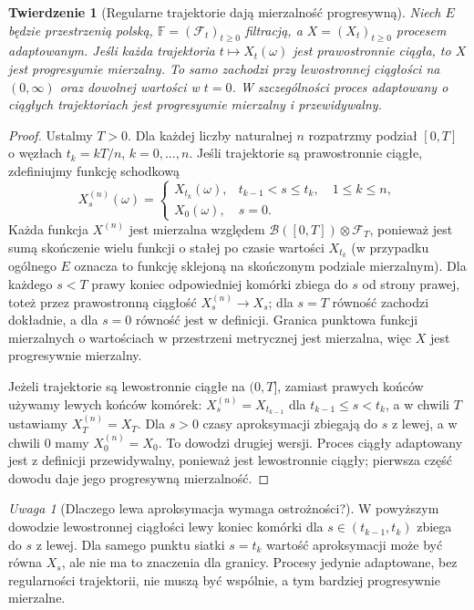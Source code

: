 \documentclass[11pt,a4paper,oneside]{report}
\numberwithin{equation}{chapter}
\theoremstyle{plain}
\newtheorem{twierdzenie}{Twierdzenie}[chapter]
\theoremstyle{definition}
\theoremstyle{remark}
\newtheorem{uwaga}{Uwaga}[chapter]
\newcommand{\calF}{\mathcal{F}}
\newcommand{\calB}{\mathcal{B}}
\begin{document}
\begin{twierdzenie}[Regularne trajektorie dają mierzalność progresywną]
\label{thm:prog}
Niech $E$ będzie przestrzenią polską,
$\mathbb F=(\calF_t)_{t\ge0}$ filtracją, a
$X=(X_t)_{t\ge0}$ procesem adaptowanym.
Jeśli każda trajektoria $t\mapsto X_t(\omega)$
jest prawostronnie ciągła, to $X$ jest progresywnie
mierzalny. To samo zachodzi przy lewostronnej
ciągłości na $(0,\infty)$ oraz dowolnej wartości w
$t=0$. W szczególności proces adaptowany o ciągłych
trajektoriach jest progresywnie mierzalny i przewidywalny.
\end{twierdzenie}
\begin{proof}
Ustalmy $T>0$. Dla każdej liczby naturalnej $n$
rozpatrzmy podział $[0,T]$ o węzłach
$t_k=kT/n$, $k=0,\ldots,n$. Jeśli trajektorie są
prawostronnie ciągłe, zdefiniujmy funkcję schodkową
\[
X^{(n)}_s(\omega)=
\begin{cases}
X_{t_k}(\omega),&t_{k-1}<s\le t_k,\quad 1\le k\le n,\\
X_0(\omega),&s=0.
\end{cases}
\]
Każda funkcja $X^{(n)}$ jest mierzalna względem
$\calB([0,T])\otimes\calF_T$, ponieważ jest sumą
skończenie wielu funkcji o stałej po czasie wartości
$X_{t_k}$ (w przypadku ogólnego $E$ oznacza to
funkcję sklejoną na skończonym podziale mierzalnym).
Dla każdego $s<T$ prawy koniec odpowiedniej komórki
zbiega do $s$ od strony prawej, toteż przez
prawostronną ciągłość $X^{(n)}_s\to X_s$;
dla $s=T$ równość zachodzi dokładnie, a dla $s=0$
równość jest w definicji. Granica punktowa funkcji
mierzalnych o wartościach w przestrzeni metrycznej
jest mierzalna, więc $X$ jest progresywnie mierzalny.

Jeżeli trajektorie są lewostronnie ciągłe na $(0,T]$,
zamiast prawych końców używamy lewych końców
komórek: $X^{(n)}_s=X_{t_{k-1}}$ dla
$t_{k-1}\le s<t_k$, a w chwili $T$ ustawiamy
$X^{(n)}_T=X_T$. Dla $s>0$ czasy aproksymacji
zbiegają do $s$ z lewej, a w chwili $0$ mamy
$X^{(n)}_0=X_0$. To dowodzi drugiej wersji.
Proces ciągły adaptowany jest z definicji
przewidywalny, ponieważ jest lewostronnie ciągły;
pierwsza część dowodu daje jego progresywną mierzalność.
\end{proof}

\begin{uwaga}[Dlaczego lewa aproksymacja wymaga ostrożności?]
W powyższym dowodzie lewostronnej ciągłości lewy koniec
komórki dla $s\in(t_{k-1},t_k)$ zbiega do $s$ z lewej.
Dla samego punktu siatki $s=t_k$ wartość
aproksymacji może być równa $X_s$, ale nie ma to
znaczenia dla granicy. Procesy jedynie adaptowane,
bez regularności trajektorii, nie muszą być wspólnie,
a tym bardziej progresywnie mierzalne.
\end{uwaga}
\end{document}
